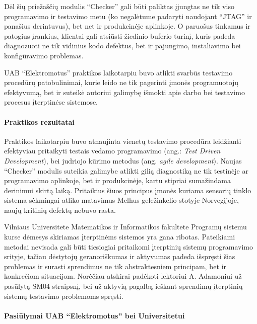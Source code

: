 \documentclass[12pt, a4paper, lithuanian, final]{article}
\begin{document}
Dėl šių priežaščių modulis "`Checker"' gali būti paliktas įjungtas ne tik viso programavimo ir testavimo metu (ko negalėtume padaryti naudojant "`JTAG"' ir panašius derintuvus), bet net ir produkcinėje aplinkoje. O paruošus tinkamus ir patogius įrankius, klientai gali atsiūsti žiedinio buferio turinį, kuris padeda diagnozuoti ne tik vidinius kodo defektus, bet ir pajungimo, instaliavimo bei konfigūravimo problemas.





UAB "`Elektromotus"' praktikos laikotarpiu buvo atlikti svarbūs testavimo procedūrų patobulinimai, kurie leido ne tik pagerinti įmonės programuotojų efektyvumą, bet ir suteikė autoriui galimybę išmokti apie darbo bei testavimo procesus įterptinėse sistemose.

\paragraph{Praktikos rezultatai}

Praktikos laikotarpiu buvo atnaujinta vienetų testavimo procedūra leidžianti efektyviau pritaikyti testais vedamo programavimo (ang.: \textit{Test Driven Development}), bei judriojo kūrimo metodus (ang. \textit{agile development}).
Naujas "`Checker"' modulis suteikia galimybe atlikti gilią diagnostiką ne tik testinėje ar programavimo aplinkoje, bet ir produkcinėje, kartu stipriai sumažindama derinimui skirtą laiką.
Pritaikius šiuos principus įmonės kuriama sensorių tinklo sistema sėkmingai atliko matavimus Melhus geležinkelio stotyje Norvegijoje, naujų kritinių defektų nebuvo rasta.


Vilniaus Universitete Matematikos ir Informatikos fakultete Programų sistemu kurse dėmesys skiriamas įterptinėms sistemos yra gana ribotas.
Pateikiami metodai nevisada gali būti tiesiogiai pritaikomi įterptinių sistemų programavimo srityje, tačiau dėstytojų geranoriškumas ir aktyvumas padeda išspręsti šias problemas ir surasti sprendimus ne tik abstraktesniem principam, bet ir konkrečiom situacijom.
Norėčiau atskirai padėkoti lektoriui A. Adamoniui už pasūlytą SM04 straipsnį, bei už aktyvią pagalbą ieškant sprendimų įterptinių sistemų testavimo problemoms spręsti.




\paragraph{Pasiūlymai UAB "`Elektromotus"' bei Universitetui}
\end{document}
